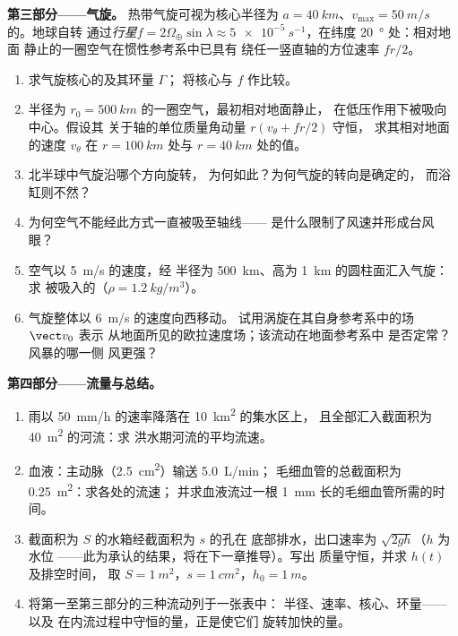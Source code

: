 \begin{problem}
\medskip
\noindent\textbf{第三部分——气旋。}
热带气旋可视为核心半径为
$a = \qty{40}{km}$、$v_{\max} = \qty{50}{m/s}$ 的。地球自转
通过\emph{行星}$f = 2\Omega_\oplus\sin\lambda
\approx \qty{5e-5}{s^{-1}}$，在纬度 \qty{20}{\degree} 处：相对地面
静止的一圈空气在惯性参考系中已具有
绕任一竖直轴的方位速率 $fr/2$。
\begin{enumerate}[resume]
  \item 求气旋核心的及其环量 $\Gamma$；
        将核心与 $f$ 作比较。
  \item 半径为 $r_0 = \qty{500}{km}$ 的一圈空气，最初相对地面静止，
        在低压作用下被吸向中心。假设其
        关于轴的单位质量角动量 $r(v_\theta + fr/2)$ 守恒，
        求其相对地面的速度
        $v_\theta$ 在 $r = \qty{100}{km}$ 处与
        $r = \qty{40}{km}$ 处的值。
  \item 北半球中气旋沿哪个方向旋转，
        为何如此？为何气旋的转向是确定的，
        而浴缸则不然？
  \item 为何空气不能经此方式一直被吸至轴线——
        是什么限制了风速并形成台风眼？
  \item 空气以 \qty{5}{m/s} 的速度，经
        半径为 \qty{500}{km}、高为 \qty{1}{km} 的圆柱面汇入气旋：求
        被吸入的（$\rho = \qty{1.2}{kg/m^3}$）。
  \item 气旋整体以 \qty{6}{m/s} 的速度向西移动。
        试用涡旋在其自身参考系中的场 $\vect v_0$ 表示
        从地面所见的欧拉速度场；该流动在地面参考系中
        是否定常？风暴的哪一侧
        风更强？
\end{enumerate}

\medskip
\noindent\textbf{第四部分——流量与总结。}
\begin{enumerate}[resume]
  \item 雨以 \qty{50}{mm/h} 的速率降落在 \qty{10}{km^2} 的集水区上，
        且全部汇入截面积为 \qty{40}{m^2} 的河流：求
        洪水期河流的平均流速。
  \item 血液：主动脉（\qty{2.5}{cm^2}）输送 \qty{5.0}{L/min}；
        毛细血管的总截面积为 \qty{0.25}{m^2}：求各处的流速；
        并求血液流过一根 \qty{1}{mm} 长的毛细血管所需的时间。
  \item 截面积为 $S$ 的水箱经截面积为 $s$ 的孔在
        底部排水，出口速率为 $\sqrt{2gh}$（$h$ 为水位
——此为承认的结果，将在下一章推导）。写出
        质量守恒，并求 $h(t)$ 及排空时间，
        取 $S = \qty{1}{m^2}$，$s = \qty{1}{cm^2}$，$h_0 = \qty{1}{m}$。
  \item 将第一至第三部分的三种流动列于一张表中：
        半径、速率、核心、环量——以及
        在内流过程中守恒的量，正是使它们
        旋转加快的量。
\end{enumerate}
\end{problem}
